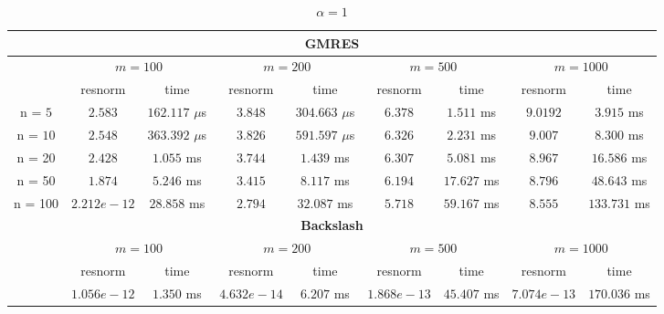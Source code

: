 \begin{table}
\centering
\caption{$\alpha = 1$}
\begin{threeparttable}
{\def\arraystretch{1.3}
\begin{tabular}{ccccccccc}
  \toprule
  \multicolumn{9}{c}{\textbf{GMRES}}\\
\midrule
& \multicolumn{2}{c}{$m = 100$}&\multicolumn{2}{c}{$m = 200$}&\multicolumn{2}{c}{$m = 500$}&\multicolumn{2}{c}{$m = 1000$}\\
\midrule
& resnorm & time & resnorm & time & resnorm & time &resnorm & time \\
\midrule
n = $5$ & $2.583$ & $162.117$ $\mu $s & $3.848$ & $304.663$ $\mu$s & $6.378$ & $1.511$ ms & $9.0192$ & $3.915$ ms\\
n = $10$ & $2.548$ & $363.392$ $\mu$s & $3.826$ & $591.597$ $\mu$s & $6.326$ & $2.231$ ms & $9.007$ & $8.300$  ms\\
n = 20 & $2.428$ & $1.055$ ms & $3.744$ & $1.439$ ms & $6.307$ & $5.081$ ms & $8.967$ & $16.586$ ms\\
n = 50 & $1.874$ & $5.246$ ms & $3.415$ & $8.117$ ms & $6.194$ & $17.627$ ms & $8.796$ & $48.643$ ms\\
n = 100 & $2.212e-12$ & $28.858$ ms & $2.794$ & $32.087$ ms & $5.718$ & $59.167$ ms & $8.555$ & $133.731$ ms\\
\bottomrule
\multicolumn{9}{c}{\textbf{Backslash}}\\
\midrule
& \multicolumn{2}{c}{$m = 100$} & \multicolumn{2}{c}{$m = 200$} & \multicolumn{2}{c}{$m = 500$} & \multicolumn{2}{c}{$m = 1000$}\\
\midrule
& resnorm & time & resnorm & time & resnorm & time & resnorm & time\\
\midrule
 & $1.056e-12$ & $1.350$ ms & $4.632e-14$ & $6.207$ ms & $1.868e-13$ & $45.407$ ms & $7.074e-13$ & $170.036$ ms \\
\bottomrule

\end{tabular}
}
\end{threeparttable}
\end{table}




